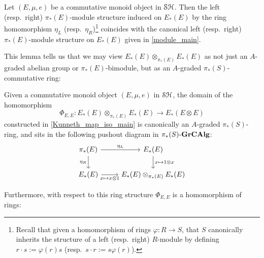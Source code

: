 \documentclass[../main.tex]{subfiles}
\begin{document}
\begin{lemma}\label{eta_L_left_module/eta_R_right_module_coincide}
    Let $(E,\mu,e)$ be a commutative monoid object in $\mathcal{SH}$. Then the left (resp.\ right) $\pi_*(E)$-module structure induced on $E_*(E)$ by the ring homomorphism $\eta_L$ (resp.\ $\eta_R$)\footnote{Recall that given a homomorphism of rings $\varphi:R\to S$, that $S$ canonically inherits the structure of a left (resp.\ right) $R$-module by defining $r\cdot s:=\varphi(r)s$ (resp.\ $s\cdot r:=s\varphi(r)$).} coincides with the canonical left (resp.\ right) $\pi_*(E)$-module structure on $E_*(E)$ given in \autoref{module_main}.
\end{lemma}

This lemma tells us that we may view $E_*(E)\otimes_{\pi_*(E)}E_*(E)$ as not just an $A$-graded abelian group or $\pi_*(E)$-bimodule, but as an $A$-graded $\pi_*(S)$-commutative ring:

\begin{corollary}\label{E*E_ox_E*E_is_A-graded_pi*S-commutative_ring}
    Given a %
	commutative monoid object $(E,\mu,e)$ in $\mathcal{SH}$, the domain of the %
	homomorphism
    \[\Phi_{E,E}:E_*(E)\otimes_{\pi_*(E)}E_*(E)\to E_*(E\otimes E)\]
    constructed in \autoref{Kunneth_map_iso_main} is canonically an $A$-graded $\pi_*(S)$-ring, and sits in the following pushout diagram in ${\pi_*(S)}\text-\mathbf{GrCAlg}$:
    \[\begin{tikzcd}
        {\pi_*(E)} & {E_*(E)} \\
        {E_*(E)} & {E_*(E)\otimes_{\pi_*(E)}E_*(E)}
        \arrow["{\eta_L}", from=1-1, to=1-2]
        \arrow["{\eta_R}"', from=1-1, to=2-1]
        \arrow["{x\mapsto x\otimes 1}"', from=2-1, to=2-2]
        \arrow["{x\mapsto1\otimes x}", from=1-2, to=2-2]
    \end{tikzcd}\]
\end{corollary}

Furthermore, with respect to this ring structure $\Phi_{E,E}$ is a homomorphism of rings:
\end{document}
